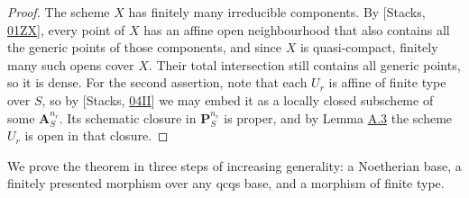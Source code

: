 \documentclass[11pt]{article}
\begin{document}
\begin{proof}[{Proof}]\label{bp68}%
The scheme \(X\) has finitely many irreducible components. By [Stacks, \href{https://stacks.math.columbia.edu/tag/01ZX}{01ZX}], every point of \(X\) has an affine open neighbourhood that also contains all the generic points of those components, and since \(X\) is quasi-compact, finitely many such opens cover \(X\). Their total intersection still contains all generic points, so it is dense. For the second assertion, note that each \(U_r\) is affine of finite type over \(S\), so by [Stacks, \href{https://stacks.math.columbia.edu/tag/04II}{04II}] we may embed it as a locally closed subscheme of some \(\mathbf A^{n_r}_S\). Its schematic closure in \(\mathbf P^{n_r}_S\) is proper, and by Lemma \hyperref[bp11]{A.3} the scheme \(U_r\) is open in that closure.
\end{proof}

\label{bp69}%
We prove the theorem in three steps of increasing generality: a Noetherian base, a finitely presented morphism over any qcqs base, and a morphism of finite type.
\end{document}
